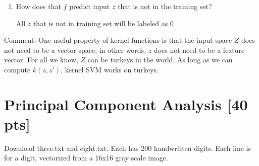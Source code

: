 \documentclass[a4paper]{article}
\theoremstyle{definition}
\newenvironment{soln}{
    \leavevmode\color{blue}\ignorespaces
}{}
\begin{document}
\begin{enumerate}
\item How does that $f$ predict input $z$ that is not in the training set?

\begin{soln}
All $z$ that is not in training set will be labeled as 0
\end{soln}

\end{enumerate}

Comment: One useful property of kernel functions is that the input space $Z$ does not need to be a vector space; in other words, $z$ does not need to be a feature vector.  For all we know, $Z$ can be turkeys in the world.  As long as we can compute $k(z,z')$, kernel SVM works on turkeys.

\section{Principal Component Analysis [40 pts]}
Download three.txt and eight.txt.  Each has 200 handwritten digits.  Each line is for a digit, vectorized from a 16x16 gray scale image.  
\end{document}
